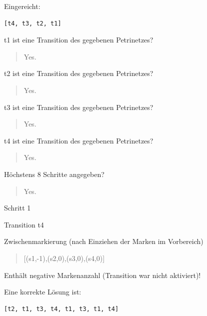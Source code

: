 Eingereicht:


\begin{verbatim}
[t4, t3, t2, t1]
\end{verbatim}


t1 ist eine Transition des gegebenen Petrinetzes?\begin{quote}Yes.\end{quote}t2 ist eine Transition des gegebenen Petrinetzes?\begin{quote}Yes.\end{quote}t3 ist eine Transition des gegebenen Petrinetzes?\begin{quote}Yes.\end{quote}t4 ist eine Transition des gegebenen Petrinetzes?\begin{quote}Yes.\end{quote}Höchstens 8 Schritte angegeben?\begin{quote}Yes.\end{quote}Schritt 1

 Transition t4 

Zwischenmarkierung (nach Einziehen der Marken im Vorbereich)

\begin{quote} [(s1,-1),(s2,0),(s3,0),(s4,0)] \end{quote}Enthält negative Markenanzahl (Transition war nicht aktiviert)!

Eine korrekte Lösung ist:
\begin{verbatim}
[t2, t1, t3, t4, t1, t3, t1, t4]
\end{verbatim}


